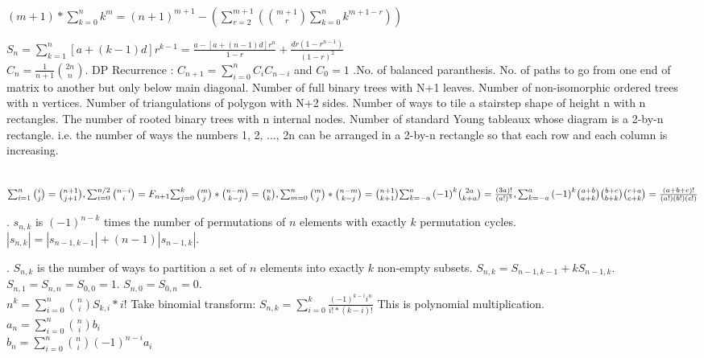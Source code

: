  
 \\
 
$\left(m+1\right) * \sum_{k=0}^{n} k ^ m = \left(n+1\right)^{m+1} - \left(\sum_{r=2}^{m+1} \left({{m+1}\choose{r}}  \sum_{k=0}^{n} k ^ {m+1-r} \right) \right)$ \\ \vspace{3mm}
 
$S_{n} = \sum_{k=1}^n [a + (k-1)d] r^{k-1} =   \frac{a - [a+(n-1)d]r^{n}}{1-r} + \frac{dr(1-r^{n-1})}{(1-r)^{2}}$ \\

$C_{n} = \frac{1}{n+1}{{2n}\choose{n}}$. DP Recurrence : $C_{n+1} = \sum_{i=0}^{n}C_{i}C_{n-i}$ and $C_{0}=1$ .No. of balanced paranthesis. No. of paths to go from one end of matrix to another but only below main diagonal. Number of full binary trees with N+1 leaves. Number of non-isomorphic ordered trees with n vertices. Number of triangulations of polygon with N+2 sides. Number of ways to tile a stairstep shape of height n with n rectangles. The number of rooted binary trees with n internal nodes.  Number of standard Young tableaux whose diagram is a 2-by-n rectangle. i.e. the number of ways the numbers 1, 2, ..., 2n can be arranged in a 2-by-n rectangle so that each row and each column is increasing.
 
\\
${\sum_{i=1}^{n} {\binom {i}{j}} = {\binom {n+1}{j+1}}}
,  {\sum_{i=0}^{n/2} {\binom {n-i}{i}} = F_{n+1}}\\
{\sum_{j=0}^{k} {\binom {m}{j}}*{\binom {n-m}{k-j}} = {\binom {n}{k}}}
, {\sum_{m=0}^{n} {\binom {m}{j}}*{\binom {n-m}{k-j}} = {\binom {n+1}{k+1}}}\\
{\sum_{k=-a}^{a} {(-1)}^k {\binom {2a}{k+a}} = \frac{(3a)!}{(a!)^3}},  
{\sum_{k=-a}^{a} {(-1)}^k {\binom {a+b}{a+k}}{\binom {b+c}{b+k}}{\binom {c+a}{c+k}} = \frac{(a+b+c)!}{(a!)(b!)(c!)}}$

.
$s_{n,k}$ is $(-1)^{n-k}$ times the number of permutations of $n$ elements with
exactly $k$ permutation cycles.
$|s_{n,k}| = |s_{n-1,k-1}| + (n-1) |s_{n-1,k}|$.
 
.
$S_{n,k}$ is the number of ways to partition a set of $n$ elements into
exactly $k$ non-empty subsets.
$S_{n,k} = S_{n-1,k-1} + k S_{n-1,k}$.  
$S_{n,1} = S_{n,n} = S_{0,0} = 1$.
$S_{n,0} = S_{0,n} = 0$.\\
$n^{k} = \sum_{i=0}^n \binom{n}{i} S_{k,i} * i!$
Take binomial transform: $S_{n,k} = \sum_{i=0}^{k} {\frac {(-1)^{k-i} i^{n}} {i! * (k-i)!}}$
This is polynomial multiplication.\\
$a_{n} = {\sum_{i=0}^{n}} \binom {n}{i} b_{i}$\\
$b_{n} = {\sum_{i=0}^{n}} \binom {n}{i} (-1)^{n-i} a_{i}$

